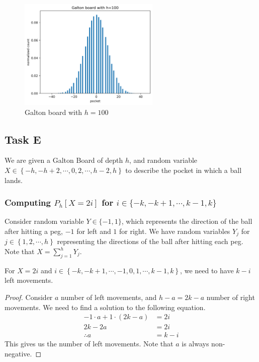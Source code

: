 \begin{figure}[H]
	\centering
	\includegraphics[width=0.6\textwidth]{img/2d3.png}
	\caption{Galton board with $h=100$}
\end{figure}

\subsection*{Task E}
We are given a Galton Board of depth $h$, and random variable $X\in \left\{-h,-h+2,\cdots,0,2,\cdots,h-2,h\right\}$ to describe the pocket in which a ball lands.

\subsubsection*{Computing $P_h[X=2i]$ \normalfont for $i\in\{-k,-k+1,\cdots,k-1,k\}$}
Consider random variable $Y \in \{-1,1\}$, which represents the direction of the ball after hitting a peg, $-1$ for left and $1$ for right.
We have random variables $Y_j$ for $j\in\left\{1,2,\cdots,h\right\}$ representing the directions of the ball after hitting each peg.
Note that $X = \sum_{j=1}^{h}Y_j$.\\

\begin{claim}
	For $X=2i$ and $i \in \left\{-k,-k+1,\cdots, -1,0,1,\cdots,k-1,k\right\}$, we need to have $k - i$ left movements.
\end{claim}
\begin{proof}
	Consider $a$ number of left movements, and $h-a=2k-a$ number of right movements.
	We need to find a solution to the following equation.
	\begin{align*}
		-1 \cdot a + 1 \cdot (2k-a) & = 2i    \\
		2k - 2a                     & = 2i    \\
		\therefore    a             & = k - i
	\end{align*}
	This gives us the number of left movements. Note that $a$ is always non-negative.
\end{proof}

